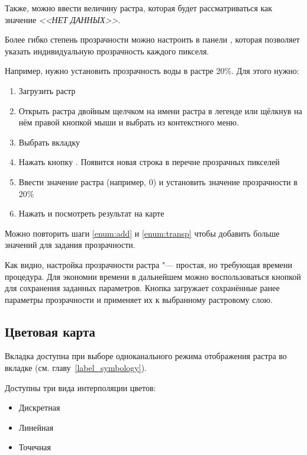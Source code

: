 Также, можно ввести величину растра, которая будет рассматриваться
как значение {\em <<НЕТ ДАННЫХ>>}.

Более гибко степень прозрачности можно настроить в панели
, которая позволяет указать индивидуальную
прозрачность каждого пикселя.

Например, нужно установить прозрачность воды в растре
 20\%. Для этого нужно:
\begin{enumerate}
 \item Загрузить растр 
 \item Открыть  растра двойным щелчком на имени растра в легенде
 или щёлкнув на нём правой кнопкой мыши и выбрать 
 из контекстного меню.
 \item Выбрать вкладку 
 \item \label{enum:add} Нажать кнопку
 . Появится
 новая строка в перечне прозрачных пикселей
 \item \label{enum:transp} Ввести значение растра (например, 0) и
 установить значение прозрачности в 20\%
 \item Нажать  и посмотреть результат на карте
\end{enumerate}

Можно повторить шаги \ref{enum:add} и \ref{enum:transp} чтобы добавить
больше значений для задания прозрачности.

Как видно, настройка прозрачности растра "--- простая, но требующая времени
процедура. Для экономии времени в дальнейшем можно воспользоваться кнопкой
 для сохранения заданных
параметров. Кнопка 
загружает сохранённые ранее параметры прозрачности и применяет их к
выбранному растровому слою.

\subsection{Цветовая карта} \label{label_colormaptab}

Вкладка  доступна при выборе одноканального режима
отображения растра во вкладке  (см. главу~\ref{label_symbology}).

Доступны три вида интерполяции цветов:
\begin{itemize}[label=--]
\item Дискретная
\item Линейная
\item Точечная
\end{itemize}

